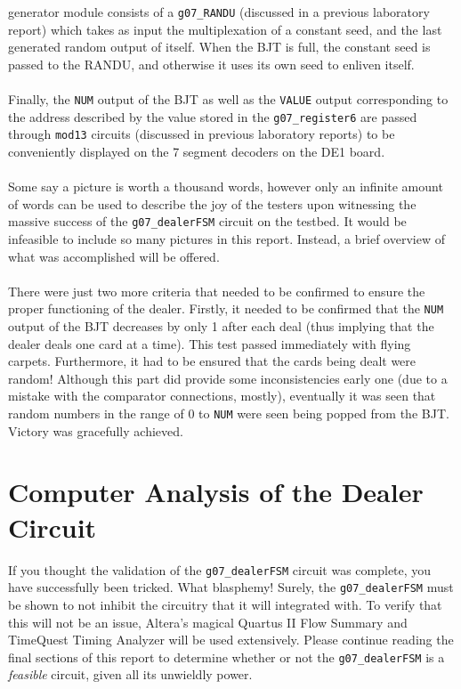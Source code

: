 \documentclass[12pt]{report}
\begin{document}
generator module consists
of a \texttt{g07\_RANDU} (discussed in a previous laboratory report) which takes as input the
multiplexation of a constant seed, and the last generated random output of itself. When the BJT is
full, the constant seed is passed to the RANDU, and otherwise it uses its own seed to enliven
itself.\\\\
Finally, the \texttt{NUM} output of the BJT as well as the \texttt{VALUE} output corresponding to
the address described by the value stored in the \texttt{g07\_register6} are passed through
\texttt{mod13} circuits (discussed in previous laboratory reports) to be conveniently displayed on
the 7 segment decoders on the DE1 board.\\\\
Some say a picture is worth a thousand words, however only an infinite amount of words can be used
to describe the joy of the testers upon witnessing the massive success of the
\texttt{g07\_dealerFSM} circuit on the testbed. It would be infeasible to include so many pictures
in this report. Instead, a brief overview of what was accomplished will be offered.\\\\
There were just two more criteria that needed to be confirmed to ensure the proper functioning of
the dealer. Firstly, it needed to be confirmed that the \texttt{NUM} output of the BJT decreases by
only 1 after each deal (thus implying that the dealer deals one card at a time). This test passed
immediately with flying carpets. Furthermore, it had to be ensured that the cards being dealt were
random! Although this part did provide some inconsistencies early one (due to a mistake with the
comparator connections, mostly), eventually it was seen that random numbers in the range of 0 to
\texttt{NUM} were seen being popped from the BJT. Victory was gracefully achieved.

\chapter*{Computer Analysis of the Dealer Circuit}
If you thought the validation of the \texttt{g07\_dealerFSM} circuit was complete, you have
successfully been tricked. What blasphemy! Surely, the \texttt{g07\_dealerFSM} must be shown to not inhibit the
circuitry that it will integrated with. To verify that this will not be an issue, Altera's magical
Quartus II Flow Summary and TimeQuest Timing Analyzer will be used extensively. Please continue
reading the final sections of this report to determine whether or not the \texttt{g07\_dealerFSM} is
a \textit{feasible} circuit, given all its unwieldly power.
\end{document}

